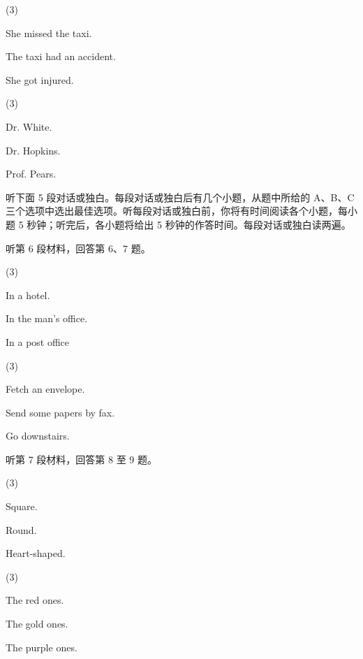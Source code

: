 \documentclass{英语试卷}
\begin{document}
\begin{choices}(3)
  \item She missed the taxi.
  \item The taxi had an accident.
  \item She got injured.
\end{choices}
\begin{choices}(3)
  \item Dr. White.
  \item Dr. Hopkins.
  \item Prof. Pears.
\end{choices}
\par 听下面 5 段对话或独白。每段对话或独白后有几个小题，从题中所给的 A、B、C 三个选项中选出最佳选项。听每段对话或独白前，你将有时间阅读各个小题，每小题 5 秒钟；听完后，各小题将给出 5 秒钟的作答时间。每段对话或独白读两遍。\par
\par 听第 6 段材料，回答第 6、7 题。\par
{}
\begin{choices}(3)
  \item In a hotel.
  \item In the man's office.
  \item In a post office
\end{choices}
\begin{choices}(3)
  \item Fetch an envelope.
  \item Send some papers by fax.
  \item Go downstairs.
\end{choices}
\par 听第 7 段材料，回答第 8 至 9 题。\par
{}
\begin{choices}(3)
  \item Square.
  \item Round.
  \item Heart-shaped.
\end{choices}
\begin{choices}(3)
  \item The red ones.
  \item The gold ones.
  \item The purple ones.
\end{choices}
\end{document}
